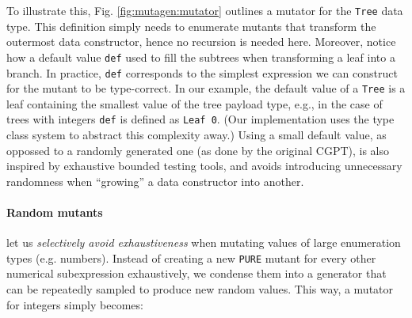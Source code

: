 \documentclass[sigconf,review,anonymous]{acmart}
\newcommand{\mutagen}{\textsc{Mutagen}\xspace}
\begin{document}
To illustrate this, Fig. \ref{fig:mutagen:mutator} outlines a mutator for the
\texttt{Tree} data type.
%
This definition simply needs to enumerate mutants that transform the outermost
data constructor, hence no recursion is needed here.
%
Moreover, notice how a default value \texttt{def} used to fill the subtrees when
transforming a leaf into a branch.
%
In practice, \texttt{def} corresponds to the simplest expression we can
construct for the mutant to be type-correct.
%
In our example, the default value of a \texttt{Tree} is a leaf containing the
smallest value of the tree payload type, e.g., in the case of trees with
integers \texttt{def} is defined as \texttt{Leaf 0}.
%
(Our implementation uses the type class system to abstract this complexity
away.)
%
Using a small default value, as oppossed to a randomly generated one (as done by
the original CGPT), is also inspired by exhaustive bounded testing tools, and
avoids introducing unnecessary randomness when ``growing'' a data constructor
into another.



%
\paragraph{Random mutants} let us \emph{selectively avoid exhaustiveness} when
  mutating values of large enumeration types (e.g. numbers).
%
%
Instead of creating a new \texttt{PURE} mutant for every other numerical
subexpression exhaustively, we condense them into a generator that can be
repeatedly sampled to produce new random values.   
%
%
This way, a mutator for integers simply becomes:
\end{document}
